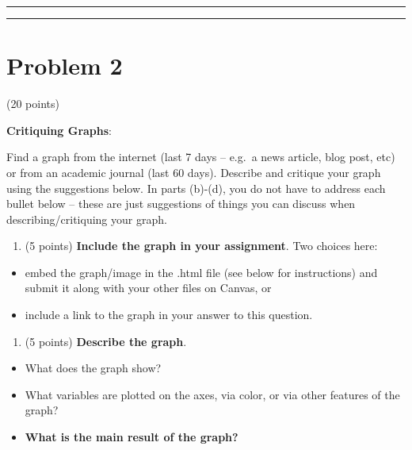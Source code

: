\documentclass[]{article}
\providecommand{\tightlist}{%
  \setlength{\itemsep}{0pt}\setlength{\parskip}{0pt}}
\begin{document}
\begin{center}\rule{0.5\linewidth}{\linethickness}\end{center}

\begin{center}\rule{0.5\linewidth}{\linethickness}\end{center}

\hypertarget{problem-2}{%
\section{Problem 2}\label{problem-2}}

(20 points)

\textbf{Critiquing Graphs}:

Find a graph from the internet (last 7 days -- e.g.~a news article, blog
post, etc) or from an academic journal (last 60 days). Describe and
critique your graph using the suggestions below. In parts (b)-(d), you
do not have to address each bullet below -- these are just suggestions
of things you can discuss when describing/critiquing your graph.

\begin{enumerate}
\def\labelenumi{\alph{enumi}.}
\tightlist
\item
  (5 points) \textbf{Include the graph in your assignment}. Two choices
  here:
\end{enumerate}

\begin{itemize}
\tightlist
\item
  embed the graph/image in the .html file (see below for instructions)
  and submit it along with your other files on Canvas, or
\item
  include a link to the graph in your answer to this question.
\end{itemize}

\begin{enumerate}
\def\labelenumi{\alph{enumi}.}
\setcounter{enumi}{1}
\tightlist
\item
  (5 points) \textbf{Describe the graph}.
\end{enumerate}

\begin{itemize}
\tightlist
\item
  What does the graph show?
\item
  What variables are plotted on the axes, via color, or via other
  features of the graph?
\item
  \textbf{What is the main result of the graph?}
\end{itemize}
\end{document}
